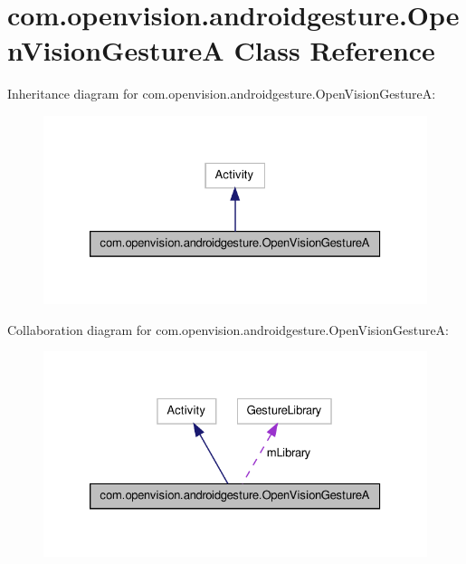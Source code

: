 \hypertarget{classcom_1_1openvision_1_1androidgesture_1_1OpenVisionGestureA}{\section{com.\-openvision.\-androidgesture.\-Open\-Vision\-Gesture\-A \-Class \-Reference}
\label{classcom_1_1openvision_1_1androidgesture_1_1OpenVisionGestureA}
}


\-Inheritance diagram for com.\-openvision.\-androidgesture.\-Open\-Vision\-Gesture\-A\-:\nopagebreak
\begin{figure}[H]
\begin{center}
\leavevmode
\includegraphics[width=326pt]{classcom_1_1openvision_1_1androidgesture_1_1OpenVisionGestureA__inherit__graph}
\end{center}
\end{figure}


\-Collaboration diagram for com.\-openvision.\-androidgesture.\-Open\-Vision\-Gesture\-A\-:\nopagebreak
\begin{figure}[H]
\begin{center}
\leavevmode
\includegraphics[width=326pt]{classcom_1_1openvision_1_1androidgesture_1_1OpenVisionGestureA__coll__graph}
\end{center}
\end{figure}
